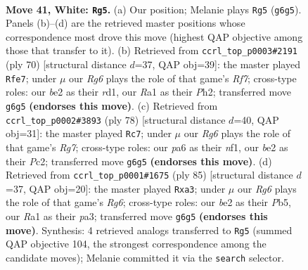 \documentclass[11pt]{article}
\begin{document}
\clearpage

\begin{figure}[p]\centering
\begin{subfigure}{0.46\textwidth}\centering
\resizebox{\linewidth}{!}{%
\newchessgame
\chessboard[
  setfen={2r5/5k1r/p1n3R1/8/1P3P2/2B5/P3b1K1/R7 w - - 15 41},
  showmover=false,
  pgfstyle=straightmove, color=movearrow, markmove={g6-g5}
]}
\caption{}
\end{subfigure}\hfill
\begin{subfigure}{0.46\textwidth}\centering
\resizebox{\linewidth}{!}{%
\newchessgame
\chessboard[
  setfen={2r3k1/R4Rp1/1p2n3/4P3/5B2/P7/5K1P/3r4 w - - 6 36},
  showmover=false,
  pgfstyle=straightmove, color=movearrow, markmove={f7-e7}
]}
\caption{}
\end{subfigure}
\\[4pt]
\begin{subfigure}{0.46\textwidth}\centering
\resizebox{\linewidth}{!}{%
\newchessgame
\chessboard[
  setfen={3r1k2/6RR/1r4p1/1p6/8/PP6/2P4P/2K2n2 w - - 0 40},
  showmover=false,
  pgfstyle=straightmove, color=movearrow, markmove={g7-c7}
]}
\caption{}
\end{subfigure}\hfill
\begin{subfigure}{0.46\textwidth}\centering
\resizebox{\linewidth}{!}{%
\newchessgame
\chessboard[
  setfen={6k1/3N1p2/p5p1/1p6/8/P5r1/4Bb1K/3R4 b - - 0 43},
  showmover=false,
  pgfstyle=straightmove, color=movearrow, markmove={g3-a3}
]}
\caption{}
\end{subfigure}
\caption{\textbf{Move 41, White: \texttt{Rg5}.} (a) Our position; Melanie plays \texttt{Rg5} (\texttt{g6g5}). Panels (b)--(d) are the retrieved master positions whose correspondence most drove this move (highest QAP objective among those that transfer to it). (b) Retrieved from \texttt{ccrl\_top\_p0003\#2191} (ply 70) [structural distance $d$=37, QAP obj=39]: the master played \texttt{Rfe7}; under $\mu$ our \emph{Rg6} plays the role of that game's \emph{Rf7}; cross-type roles: our \emph{b}e2 as their \emph{r}d1, our \emph{R}a1 as their \emph{P}h2; transferred move \texttt{g6g5} \textbf{(endorses this move)}. (c) Retrieved from \texttt{ccrl\_top\_p0002\#3893} (ply 78) [structural distance $d$=40, QAP obj=31]: the master played \texttt{Rc7}; under $\mu$ our \emph{Rg6} plays the role of that game's \emph{Rg7}; cross-type roles: our \emph{p}a6 as their \emph{n}f1, our \emph{b}e2 as their \emph{P}c2; transferred move \texttt{g6g5} \textbf{(endorses this move)}. (d) Retrieved from \texttt{ccrl\_top\_p0001\#1675} (ply 85) [structural distance $d$=37, QAP obj=20]: the master played \texttt{Rxa3}; under $\mu$ our \emph{Rg6} plays the role of that game's \emph{Rg6}; cross-type roles: our \emph{b}e2 as their \emph{P}b5, our \emph{R}a1 as their \emph{p}a3; transferred move \texttt{g6g5} \textbf{(endorses this move)}. Synthesis: 4 retrieved analogs transferred to \texttt{Rg5} (summed QAP objective 104, the strongest correspondence among the candidate moves); Melanie committed it via the \texttt{search} selector.}
\label{fig:thought-m80}
\end{figure}
\end{document}
